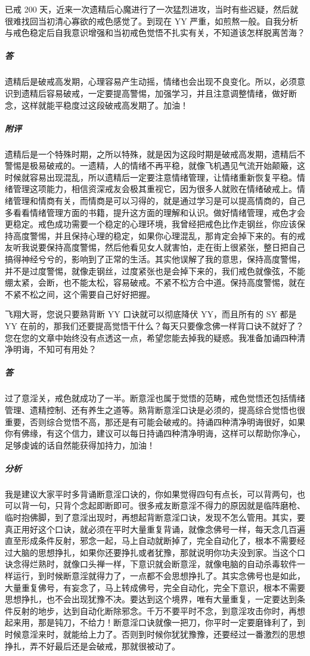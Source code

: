 \begin{case}
    已戒 200 天，近来一次遗精后心魔进行了一次猛烈进攻，当时有些迟疑，然后就很难找回当初清心寡欲的戒色感觉了。到现在 YY 严重，如煎熬一般。自我分析与戒色稳定后自我意识增强和当初戒色觉悟不扎实有关，不知道该怎样脱离苦海？
    \subparagraph{答} 遗精后是破戒高发期，心理容易产生动摇，情绪也会出现不良变化。所以，必须意识到遗精后容易破戒，一定要提高警惕，加强学习，并且注意调整情绪，做好断念，这样就能平稳度过这段破戒高发期了。加油！
    \subparagraph{附评}遗精后是一个特殊时期，之所以特殊，就是因为这段时期是破戒高发期，遗精后不警惕是极易破戒的。一遗精，人的情绪不再平稳，就像飞机遇见气流开始颠簸，这时候就容易出现混乱，所以遗精后一定要注意情绪管理，让情绪重新恢复平稳。情绪管理这项能力，相信资深戒友会极其重视它，因为很多人就败在情绪破戒上。情绪管理和情商有关，而情商是可以习得的，就是通过学习是可以提高情商的，自己多看看情绪管理方面的书籍，提升这方面的理解和认识。做好情绪管理，戒色才会更稳定。戒色成功需要一个稳定的心理环境，我曾经把戒色比作走钢丝，你应该保持高度警惕，并且保持心理的稳定，如果你心理混乱，那肯定会掉下来的。有的戒友听我说要保持高度警惕，然后他看见女人就害怕，走在街上很紧张，整日把自己搞得神经兮兮的，影响到了正常的生活。其实他误解了我的意思，保持高度警惕，并不是过度警惕，就像走钢丝，过度紧张也是会掉下来的，我们戒色就像弦，不能绷太紧，会断，也不能太松，容易破戒。不紧不松方合中道。保持高度警惕，就在不紧不松之间，这个需要自己好好把握。
\end{case}

\begin{case}
    飞翔大哥，您说只要熟背断 YY 口诀就可以彻底降伏 YY，而且所有的 SY 都是 YY 在前的，那我们还要提高觉悟干什么？每天只要像念佛一样背口诀不就好了？您在您的文章中始终没有点透这一点，希望您能去掉我的疑惑。我准备加诵四种清净明诲，不知可有用处？
    \subparagraph{答} 过了意淫关，戒色就成功了一半。断意淫也属于觉悟的范畴，戒色觉悟还包括情绪管理、遗精控制、还有养生之道等。熟背断意淫口诀是必须的，提高综合觉悟也很重要，否则综合觉悟不高，那还是有可能会破戒的。持诵四种清净明诲很好，如果你有佛缘，有这个信力，建议可以每日持诵四种清净明诲，这样可以帮助你净心，足够虔诚的话自然能获得加持力，加油！
    \subparagraph{分析} 我是建议大家平时多背诵断意淫口诀的，你如果觉得四句有点长，可以背两句，也可以背一句，只背个念起即断即可。很多戒友断意淫不得力的原因就是临阵磨枪、临时抱佛脚，到了意淫出现时，再想起背断意淫口诀，发现不怎么管用。其实，要真正用好这个口诀，就必须在平时大量重复背诵，就像念佛号一样，每天念几百遍直至形成条件反射，邪念一起，马上自动就断掉了，完全自动化了，根本不需要经过大脑的思想挣扎，如果你还要挣扎或者犹豫，那就说明你功夫没到家。当这个口诀念得烂熟时，就像口头禅一样，下意识就会断意淫，就像电脑的自动杀毒软件一样运行，到时候断意淫就得力了，一点都不会思想挣扎了。其实念佛号也是如此，大量重复佛号，有妄念了，马上转成佛号，完全自动化，完全下意识，根本不需要思想挣扎，也不会出现犹豫不决。要达到这个境界，唯有大量重复，一定要达到条件反射的地步，达到自动化断除邪念。千万不要平时不念，到意淫攻击你时，再想起来用，那是钝刀，不给力！断意淫口诀就像一把刀，你平时一定要磨锋利了，到时候意淫来时，就能给上力了。否则到时候你犹犹豫豫，还要经过一番激烈的思想挣扎，弄不好最后还是会破戒，那就很被动了。
\end{case}

